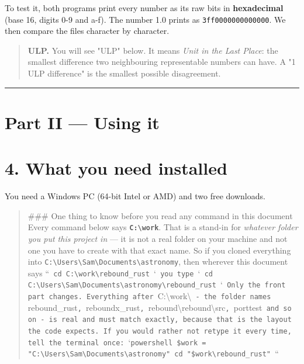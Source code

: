 \documentclass[11pt]{article}
\begin{document}
To test it, both programs print every number as its raw bits in \textbf{hexadecimal} (base 16, digits 0-9 and a-f). The number 1.0 prints as \texttt{3ff0000000000000}. We then compare the files character by character.

\begin{quote}
\textbf{ULP.} You will see "ULP" below. It means \emph{Unit in the Last Place}: the smallest difference two neighbouring representable numbers can have. A "1 ULP difference" is the smallest possible disagreement.
\end{quote}

\bigskip\hrule\bigskip

\clearpage
\section*{Part II --- Using it}

\section{4. What you need installed}

You need a Windows PC (64-bit Intel or AMD) and two free downloads.

\begin{quote}
\#\#\# One thing to know before you read any command in this document  Every command below says \textbf{\texttt{C:\textbackslash{}work}}. That is a stand-in for \emph{whatever folder you put this project in} --- it is not a real folder on your machine and not one you have to create with that exact name.  So if you cloned everything into \texttt{C:\textbackslash{}Users\textbackslash{}Sam\textbackslash{}Documents\textbackslash{}astronomy}, then wherever this document says  ``\texttt{ cd C:\textbackslash{}work\textbackslash{}rebound\_rust }`\texttt{  you type  }`\texttt{ cd C:\textbackslash{}Users\textbackslash{}Sam\textbackslash{}Documents\textbackslash{}astronomy\textbackslash{}rebound\_rust }`\texttt{  Only the front part changes. Everything after }C:\textbackslash{}work\textbackslash{}\texttt{ - the folder names }rebound\_rust\texttt{, }reboundx\_rust\texttt{, }rebound\textbackslash{}rebound\textbackslash{}src\texttt{, }porttest\texttt{ and so on - is real and must match exactly, because that is the layout the code expects.  If you would rather not retype it every time, tell the terminal once:  }`\texttt{powershell \$work = "C:\textbackslash{}Users\textbackslash{}Sam\textbackslash{}Documents\textbackslash{}astronomy" cd "\$work\textbackslash{}rebound\_rust" }``
\end{quote}
\end{document}
